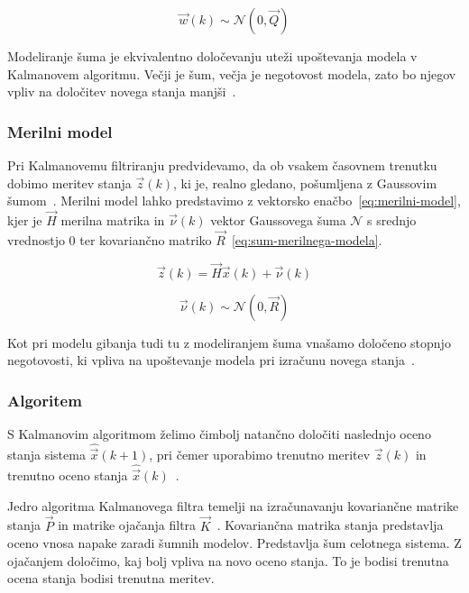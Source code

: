 \begin{equation}
 \vec{w}(k) \sim \mathcal{N}\left(0,\vec{Q}\right)
 \label{eq:sum-modela-gibanja}
\end{equation}

Modeliranje šuma je ekvivalentno določevanju uteži upoštevanja modela v Kalmanovem algoritmu. Večji je šum, večja je negotovost modela, zato bo njegov vpliv na določitev novega stanja manjši~\cite{trucco1998introductory}.


\subsubsection{Merilni model}
Pri Kalmanovemu filtriranju predvidevamo, da ob vsakem časovnem trenutku dobimo meritev stanja $\vec{z}(k)$, ki je, realno gledano, pošumljena z Gaussovim šumom~\cite{trucco1998introductory}. Merilni model lahko predstavimo z vektorsko enačbo~\eqref{eq:merilni-model}, kjer je $\vec{H}$ merilna matrika in $\vec{\nu}(k)$ vektor Gaussovega šuma $\mathcal{N}$ s srednjo vrednostjo $0$ ter kovariančno matriko $\vec{R}$~\eqref{eq:sum-merilnega-modela}.


\begin{equation}
 \vec{z}(k) = \vec{H} \vec{x}(k) + \vec{\nu}(k)
 \label{eq:merilni-model}
\end{equation}

\begin{equation}
\vec{\nu}(k) \sim \mathcal{N} \left( 0, \vec{R} \right)
\label{eq:sum-merilnega-modela}
\end{equation}


Kot pri modelu gibanja tudi tu z modeliranjem šuma vnašamo določeno stopnjo negotovosti, ki vpliva na upoštevanje modela pri izračunu novega stanja~\cite{trucco1998introductory}.


\subsubsection{Algoritem}
S Kalmanovim algoritmom želimo čimbolj natančno določiti naslednjo oceno stanja sistema $\hat{\vec{x}}(k+1)$, pri čemer uporabimo trenutno meritev $\vec{z}(k)$ in trenutno oceno stanja $\hat{\vec{x}}(k)$~\cite{trucco1998introductory}. 

Jedro algoritma Kalmanovega filtra temelji na izračunavanju kovariančne matrike stanja $\vec{P}$ in matrike ojačanja filtra $\vec{K}$~\cite{trucco1998introductory}. Kovariančna matrika stanja predstavlja oceno vnosa napake zaradi šumnih modelov. Predstavlja šum celotnega sistema. Z ojačanjem določimo, kaj bolj vpliva na novo oceno stanja. To je bodisi trenutna ocena stanja bodisi trenutna meritev.

